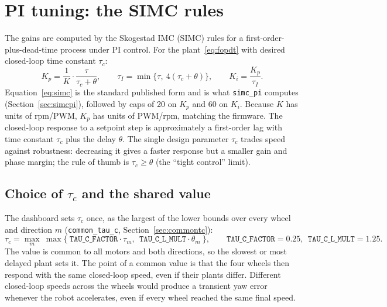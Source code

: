 \documentclass[11pt,a4paper]{report}
\newcommand{\code}[1]{\texttt{#1}}
\begin{document}
\section{PI tuning: the SIMC rules}
The gains are computed by the Skogestad IMC (SIMC) rules for a first-order-plus-dead-time process under PI control. For the plant~\eqref{eq:fopdt} with desired closed-loop time constant $\tau_c$:
\begin{equation}
  K_p = \frac{1}{K}\cdot\frac{\tau}{\tau_c+\theta},\qquad
  \tau_I = \min\{\tau,\ 4(\tau_c+\theta)\},\qquad
  K_i = \frac{K_p}{\tau_I}. \label{eq:simc}
\end{equation}
Equation~\eqref{eq:simc} is the standard published form and is what \code{simc\_pi} computes (Section~\ref{sec:simcpi}), followed by caps of 20 on $K_p$ and 60 on $K_i$. Because $K$ has units of rpm/PWM, $K_p$ has units of PWM/rpm, matching the firmware. The closed-loop response to a setpoint step is approximately a first-order lag with time constant $\tau_c$ plus the delay $\theta$. The single design parameter $\tau_c$ trades speed against robustness: decreasing it gives a faster response but a smaller gain and phase margin; the rule of thumb is $\tau_c \ge \theta$ (the ``tight control'' limit).

\subsection{Choice of $\tau_c$ and the shared value}
The dashboard sets $\tau_c$ once, as the largest of the lower bounds over every wheel and direction $m$ (\code{common\_tau\_c}, Section~\ref{sec:commontc}):
\begin{equation}
  \tau_c = \max_{m}\ \max\{\ \texttt{TAU\_C\_FACTOR}\cdot\tau_m,\ \ \texttt{TAU\_C\_L\_MULT}\cdot\theta_m\ \},\qquad \texttt{TAU\_C\_FACTOR}=0.25,\ \ \texttt{TAU\_C\_L\_MULT}=1.25. \label{eq:tauc}
\end{equation}
The value is common to all motors and both directions, so the slowest or most delayed plant sets it. The point of a common value is that the four wheels then respond with the same closed-loop speed, even if their plants differ. Different closed-loop speeds across the wheels would produce a transient yaw error whenever the robot accelerates, even if every wheel reached the same final speed.
\end{document}
